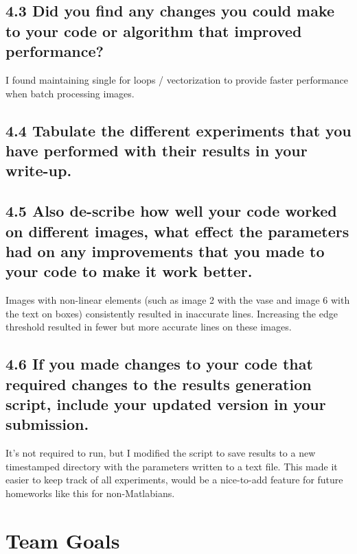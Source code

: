 \documentclass[12pt]{article}
\begin{document}
\subsection{4.3 Did you find any changes you could make to your code or algorithm that improved performance?}
I found maintaining single for loops / vectorization to provide faster performance when batch processing images.

\subsection{4.4 Tabulate the different experiments that you have performed with their results in your write-up.}

\subsection{4.5 Also de-scribe how well your code worked on different images, what effect the parameters had on any improvements that you made to your code to make it work better. }
Images with non-linear elements (such as image 2 with the vase and image 6 with the text on boxes) consistently resulted in inaccurate lines. Increasing the edge threshold resulted in fewer but more accurate lines on these images.

\subsection{4.6 If you made changes to your code that required changes to the results generation script, include your updated version in your submission.  }
It's not required to run, but I modified the script to save results to a new timestamped directory with the parameters written to a text file. This made it easier to keep track of all experiments, would be a nice-to-add feature for future homeworks like this for non-Matlabians.

\newpage


\section{Team Goals}
\end{document}
